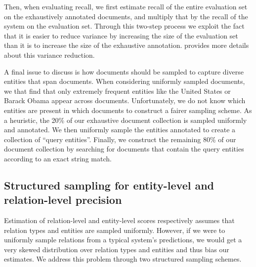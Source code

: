 
Then, when evaluating recall, we first estimate recall of the entire evaluation set on the exhaustively annotated documents, and multiply that by the recall of the system on the evaluation set. Through this two-step process we exploit the fact that it is easier to reduce variance by increasing the size of the evaluation set than it is to increase the size of the exhaustive annotation.  provides more details about this variance reduction.

A final issue to discuss is how documents should be sampled to capture diverse entities that span documents. %
When considering uniformly sampled documents, we that find that only extremely frequent entities like the United States or Barack Obama appear across documents.
Unfortunately, we do not know which entities are present in which documents to construct a fairer sampling scheme.
As a heuristic, the 20\% of our exhaustive document collection is sampled uniformly and annotated.
We then uniformly sample the entities annotated to create a collection of ``query entities''.
Finally, we construct the remaining 80\% of our document collection by searching for documents that contain the query entities according to an exact string match.

\subsection{Structured sampling for entity-level and relation-level precision}
Estimation of relation-level and entity-level scores respectively assumes that relation types and entities are sampled uniformly.
However, if we were to uniformly sample relations from a typical system's predictions, 
  we would get a very skewed distribution over relation types and entities and thus bias our estimates.
We address this problem through two structured sampling schemes.

